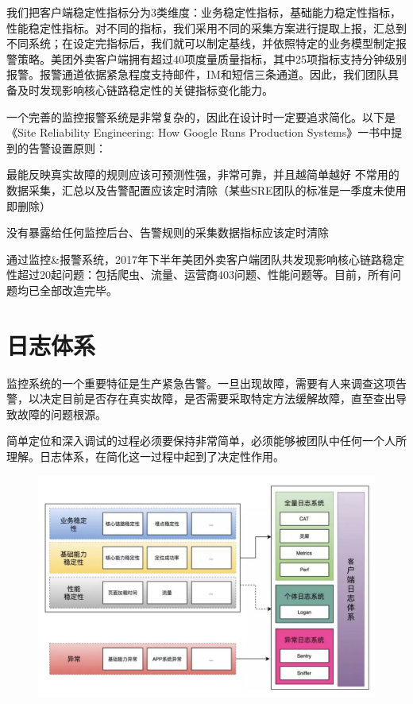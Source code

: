 \documentclass[12pt]{article}
\begin{document}
我们把客户端稳定性指标分为3类维度：业务稳定性指标，基础能力稳定性指标，性能稳定性指标。对不同的指标，我们采用不同的采集方案进行提取上报，汇总到不同系统；在设定完指标后，我们就可以制定基线，并依照特定的业务模型制定报警策略。美团外卖客户端拥有超过40项度量质量指标，其中25项指标支持分钟级别报警。报警通道依据紧急程度支持邮件，IM和短信三条通道。因此，我们团队具备及时发现影响核心链路稳定性的关键指标变化能力。

一个完善的监控报警系统是非常复杂的，因此在设计时一定要追求简化。以下是《Site Reliability Engineering: How Google Runs Production Systems》一书中提到的告警设置原则：

\begin{framed}
最能反映真实故障的规则应该可预测性强，非常可靠，并且越简单越好
不常用的数据采集，汇总以及告警配置应该定时清除（某些SRE团队的标准是一季度未使用即删除）

没有暴露给任何监控后台、告警规则的采集数据指标应该定时清除
\end{framed}

通过监控\&报警系统，2017年下半年美团外卖客户端团队共发现影响核心链路稳定性超过20起问题：包括爬虫、流量、运营商403问题、性能问题等。目前，所有问题均已全部改造完毕。

\section{日志体系}
监控系统的一个重要特征是生产紧急告警。一旦出现故障，需要有人来调查这项告警，以决定目前是否存在真实故障，是否需要采取特定方法缓解故障，直至查出导致故障的问题根源。

简单定位和深入调试的过程必须要保持非常简单，必须能够被团队中任何一个人所理解。日志体系，在简化这一过程中起到了决定性作用。

\begin{figure}[H]
    \centering
    \includegraphics[width=1\textwidth]{fig/Meituan_APP_High_5.png}
\end{figure}
\end{document}
